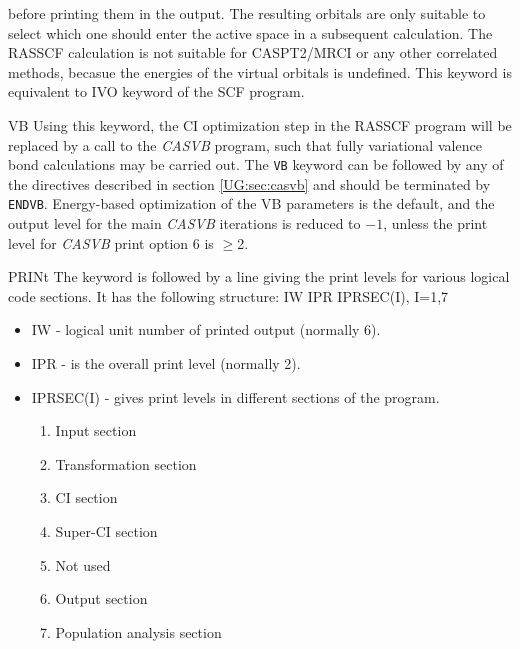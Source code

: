 \begin{keywordlist}
before printing them in the output. The resulting orbitals are only suitable to select which one
should enter the active space in a subsequent calculation. The RASSCF calculation is not suitable
for CASPT2/MRCI or any other correlated methods, becasue the energies of the virtual orbitals is 
undefined.
This keyword is equivalent to IVO keyword of the SCF program. 
\item[VB]
\label{vbinrasscf}
Using this keyword, the CI optimization step in the {\rm RASSCF} program will be
replaced by a call to the {\em CASVB} program, such that fully variational valence
bond calculations may be carried out. The {\tt VB} keyword can be followed by any
of the directives described in section \ref{UG:sec:casvb} and should be terminated
by {\tt ENDVB}. Energy-based optimization of the VB parameters is the default,
and the output level for the main {\em CASVB} iterations is reduced to $-1$,
unless the print level for {\em CASVB} print option 6 is $\geq$2.
\item[PRINt]
The keyword is followed by a line giving the print
levels for various logical code sections. It has the following structure:
IW IPR IPRSEC(I), I=1,7
\begin{itemize}
\item IW -{} logical unit number of printed output (normally 6).
\item IPR -{} is the overall print level (normally 2).
\item IPRSEC(I) -{} gives print levels in different sections of the program.
\begin{enumerate}
\item Input section
\item Transformation section
\item CI section
\item Super-{}CI section
\item Not used
\item Output section
\item Population analysis section
\end{enumerate}
\end{itemize}

\end{keywordlist}
